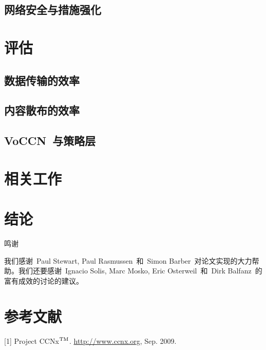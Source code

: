\subsection{网络安全与措施强化}
\label{sec:5.4}

\section{评估}
\label{sec:6}

\subsection{数据传输的效率}
\label{sec:6.1}
	
\subsection{内容散布的效率}
\label{sec:6.2}

\subsection{VoCCN~与策略层}
\label{sec:6.3}

\section{相关工作}
\label{sec:7}


\section{结论}
\label{sec:8}

\heiti
鸣谢

\songti
我们感谢~Paul Stewart, Paul Rasmussen~和~Simon Barber~对论文实现的大力帮助。我们还要感谢~Ignacio Solis, Marc Mosko, Eric Osterweil~和~Dirk Balfanz~的富有成效的讨论的建议。

\section{参考文献}
\def\tm{\leavevmode\hbox{$\rm {}^{TM}$}} %
[1] Project CCNx\tm. \url{http://www.ccnx.org}, Sep. 2009.


